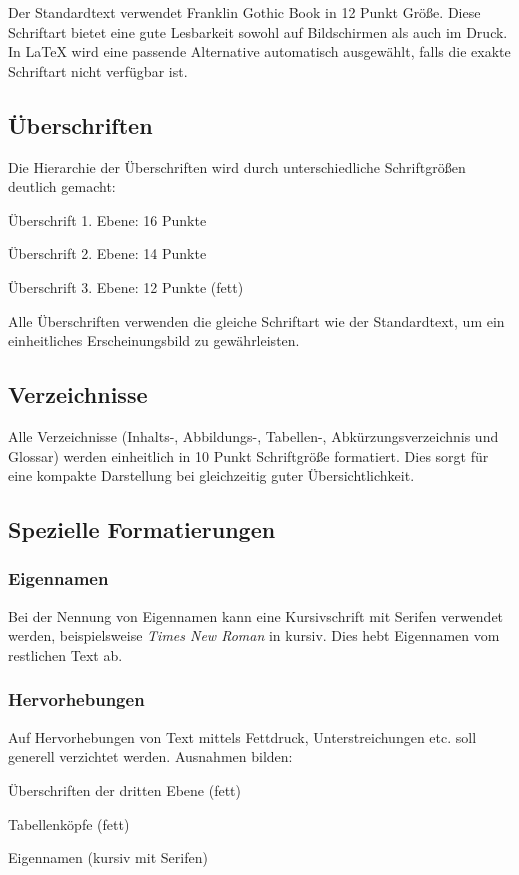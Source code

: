 Der Standardtext verwendet Franklin Gothic Book in 12 Punkt Größe. Diese Schriftart bietet eine gute Lesbarkeit sowohl auf Bildschirmen als auch im Druck. In \LaTeX{} wird eine passende Alternative automatisch ausgewählt, falls die exakte Schriftart nicht verfügbar ist.

\subsection{Überschriften}
\label{subsec:ueberschriften_format}

Die Hierarchie der Überschriften wird durch unterschiedliche Schriftgrößen deutlich gemacht:
\begin{listenabsatz}
	\item Überschrift 1. Ebene: 16 Punkte
	\item Überschrift 2. Ebene: 14 Punkte
	\item Überschrift 3. Ebene: 12 Punkte (fett)
\end{listenabsatz}

Alle Überschriften verwenden die gleiche Schriftart wie der Standardtext, um ein einheitliches Erscheinungsbild zu gewährleisten.

\subsection{Verzeichnisse}
\label{subsec:verzeichnisse_format}

Alle Verzeichnisse (Inhalts-, Abbildungs-, Tabellen-, Abkürzungsverzeichnis und Glossar) werden einheitlich in 10 Punkt Schriftgröße formatiert. Dies sorgt für eine kompakte Darstellung bei gleichzeitig guter Übersichtlichkeit.

\subsection{Spezielle Formatierungen}
\label{subsec:spezielle_formatierungen}

\subsubsection{Eigennamen}
Bei der Nennung von Eigennamen kann eine Kursivschrift mit Serifen verwendet werden, beispielsweise \emph{Times New Roman} in kursiv. Dies hebt Eigennamen vom restlichen Text ab.

\subsubsection{Hervorhebungen}
Auf Hervorhebungen von Text mittels Fettdruck, Unterstreichungen etc. soll generell verzichtet werden. Ausnahmen bilden:
\begin{listenabsatz}
	\item Überschriften der dritten Ebene (fett)
	\item Tabellenköpfe (fett)
	\item Eigennamen (kursiv mit Serifen)
\end{listenabsatz}


